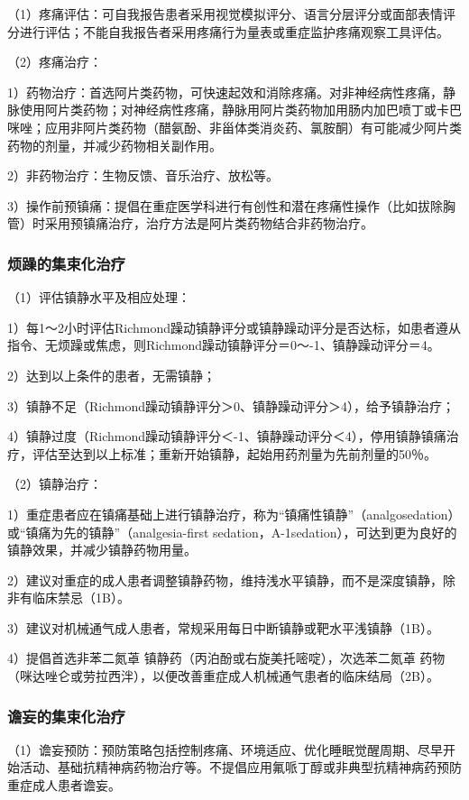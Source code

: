 （1）疼痛评估：可自我报告患者采用视觉模拟评分、语言分层评分或面部表情评分进行评估；不能自我报告者采用疼痛行为量表或重症监护疼痛观察工具评估。

（2）疼痛治疗：

1）药物治疗：首选阿片类药物，可快速起效和消除疼痛。对非神经病性疼痛，静脉使用阿片类药物；对神经病性疼痛，静脉用阿片类药物加用肠内加巴喷丁或卡巴咪唑；应用非阿片类药物（醋氨酚、非甾体类消炎药、氯胺酮）有可能减少阿片类药物的剂量，并减少药物相关副作用。

2）非药物治疗：生物反馈、音乐治疗、放松等。

3）操作前预镇痛：提倡在重症医学科进行有创性和潜在疼痛性操作（比如拔除胸管）时采用预镇痛治疗，治疗方法是阿片类药物结合非药物治疗。

\subsubsection{烦躁的集束化治疗}

（1）评估镇静水平及相应处理：

1）每1～2小时评估Richmond躁动镇静评分或镇静躁动评分是否达标，如患者遵从指令、无烦躁或焦虑，则Richmond躁动镇静评分＝0～-1、镇静躁动评分＝4。

2）达到以上条件的患者，无需镇静；

3）镇静不足（Richmond躁动镇静评分＞0、镇静躁动评分＞4），给予镇静治疗；

4）镇静过度（Richmond躁动镇静评分＜-1、镇静躁动评分＜4），停用镇静镇痛治疗，评估至达到以上标准；重新开始镇静，起始用药剂量为先前剂量的50％。

（2）镇静治疗：

1）重症患者应在镇痛基础上进行镇静治疗，称为“镇痛性镇静”（analgosedation）或“镇痛为先的镇静”（analgesia-first
sedation，A-1sedation），可达到更为良好的镇静效果，并减少镇静药物用量。

2）建议对重症的成人患者调整镇静药物，维持浅水平镇静，而不是深度镇静，除非有临床禁忌（1B）。

3）建议对机械通气成人患者，常规采用每日中断镇静或靶水平浅镇静（1B）。

4）提倡首选非苯二氮䓬
镇静药（丙泊酚或右旋美托嘧啶），次选苯二氮䓬
药物（咪达唑仑或劳拉西泮），以便改善重症成人机械通气患者的临床结局（2B）。

\subsubsection{谵妄的集束化治疗}

（1）谵妄预防：预防策略包括控制疼痛、环境适应、优化睡眠觉醒周期、尽早开始活动、基础抗精神病药物治疗等。不提倡应用氟哌丁醇或非典型抗精神病药预防重症成人患者谵妄。

